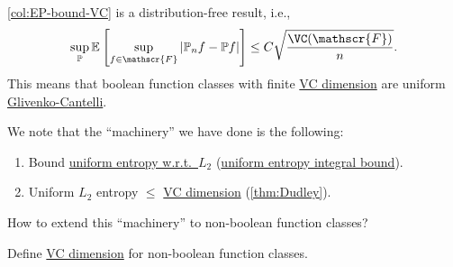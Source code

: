 \begin{remark}
	\autoref{col:EP-bound-VC} is a distribution-free result, i.e.,
	\[
		\sup _{\mathbb{P} } \mathbb{E}_{}\left[\sup _{f\in \mathscr{F}} \vert \mathbb{P} _n f - \mathbb{P} f \vert  \right] \leq C \sqrt{\frac{\VC(\mathscr{F} )}{n}} .
	\]
	This means that boolean function classes with finite \hyperref[def:VC-dimension]{VC dimension} are uniform \hyperref[def:Glivenko-Cantelli]{Glivenko-Cantelli}.
\end{remark}

We note that the ``machinery'' we have done is the following:
\begin{enumerate}
	\item Bound \hyperref[def:Koltchinskii-Pollard-entropy]{uniform entropy w.r.t.\ \(L_2\)} (\hyperref[thm:uniform-entropy-integral-bound]{uniform entropy integral bound}).
	\item Uniform \(L_2\) entropy \(\leq \) \hyperref[def:VC-dimension]{VC dimension} (\autoref{thm:Dudley}).
\end{enumerate}

\begin{problem*}
	How to extend this ``machinery'' to non-boolean function classes?
\end{problem*}
\begin{answer}
	Define \hyperref[def:VC-dimension]{VC dimension} for non-boolean function classes.
\end{answer}
